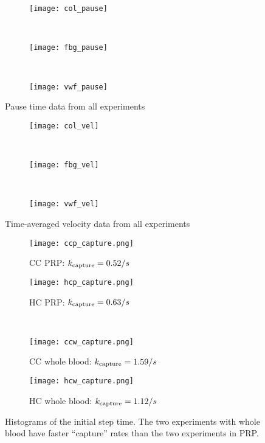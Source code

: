 \documentclass{article}
\newcommand{\tn}{\textnormal}
\begin{document}
\begin{figure}
  \centering
  \begin{subfigure}{0.75\textwidth}
    \texttt{[image: col\_pause]}
  \end{subfigure}
  \\
  \begin{subfigure}{0.75\textwidth}
    \texttt{[image: fbg\_pause]}
  \end{subfigure}
  \\
  \begin{subfigure}{0.75\textwidth}
    \texttt{[image: vwf\_pause]}
  \end{subfigure}
  \caption{Pause time data from all experiments}
  \label{fig:pause-time}
\end{figure}

\begin{figure}
  \centering
  \begin{subfigure}{0.75\textwidth}
    \texttt{[image: col\_vel]}
  \end{subfigure}
  \\
  \begin{subfigure}{0.75\textwidth}
    \texttt{[image: fbg\_vel]}
  \end{subfigure}
  \\
  \begin{subfigure}{0.75\textwidth}
    \texttt{[image: vwf\_vel]}
  \end{subfigure}
  \caption{Time-averaged velocity data from all experiments}
  \label{fig:velocity}
\end{figure}

\begin{figure}
  \centering
  \begin{subfigure}{0.48\textwidth}
    \texttt{[image: ccp\_capture.png]}
    \caption{CC PRP: $k_\tn{capture} = 0.52 / s$}
  \end{subfigure}
  \hfill
  \begin{subfigure}{0.48\textwidth}
    \texttt{[image: hcp\_capture.png]}
    \caption{HC PRP: $k_\tn{capture} = 0.63 / s$}
  \end{subfigure}
  \\
  \begin{subfigure}{0.48\textwidth}
    \texttt{[image: ccw\_capture.png]}
    \caption{CC whole blood: $k_\tn{capture} = 1.59 / s$}
  \end{subfigure}
  \hfill
  \begin{subfigure}{0.48\textwidth}
    \texttt{[image: hcw\_capture.png]}
    \caption{HC whole blood: $k_\tn{capture} = 1.12 / s$}
  \end{subfigure}
  \caption{Histograms of the initial step time. The two experiments
    with whole blood have faster ``capture'' rates than the two
    experiments in PRP.}
  \label{fig:col-capture}
\end{figure}
\end{document}
